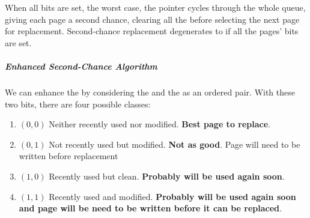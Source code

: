 When all bits are set, the worst case, the pointer cycles through the whole queue, giving each page a second chance, clearing all the  before selecting the next page for replacement.
Second-chance replacement degenerates to  if all the pages' bits are set.

\subparagraph{Enhanced Second-Chance Algorithm}\label{subpar:Enhanced_Second_Chance_Algorithm}
We can enhance the  by considering the  and the  as an ordered pair.
With these two bits, there are four possible classes:
\begin{enumerate}[noitemsep]
\item $(0, 0)$ Neither recently used nor modified. \textbf{Best page to replace}.
\item $(0, 1)$ Not recently used but modified. \textbf{Not as good}. Page will need to be written before replacement
\item $(1, 0)$ Recently used but clean. \textbf{Probably will be used again soon}.
\item $(1, 1)$ Recently used and modified. \textbf{Probably will be used again soon and page will be need to be written before it can be replaced}.
\end{enumerate}


